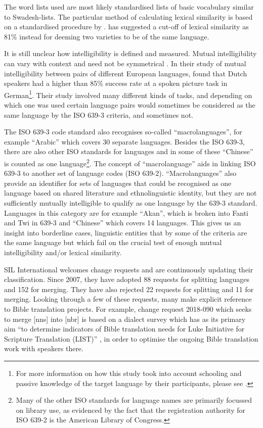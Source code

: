 \documentclass[unnumsec,webpdf,modern,medium]{oup-authoring-template}
\begin{document}
\begin{appendices}
The word lists used are most likely standardised lists of basic vocabulary similar to Swadesh-lists. The particular method of calculating lexical similarity is based on a standardised procedure by \citet{rensch1992calculating}. \citet[326]{swadesh1954perspectives} has suggested a cut-off of lexical similarity as 81\% instead for deeming two varieties to be of the same language. 

It is still unclear how intelligibility is defined and measured. Mutual intelligibility can vary with context and need not be symmetrical \citep[356]{NETTLE1998}. In their study of mutual intelligibility between pairs of different European languages, \citet{gooskens2017measuring} found that Dutch speakers had a higher than 85\% success rate at a spoken picture task in German\footnote{For more information on how this study took into account schooling and passive knowledge of the target language by their participants, please see \citet{gooskens2017measuring}.}. Their study involved many different kinds of tasks, and depending on which one was used certain language pairs would sometimes be considered as the same language by the ISO 639-3 criteria, and sometimes not.

The ISO 639-3 code standard also recognises so-called ``macrolanguages'', for example ``Arabic'' which covers 30 separate languages. Besides the ISO 639-3, there are also other ISO standards for languages and in some of these ``Chinese'' is counted as one language\footnote{Many of the other ISO standards for language names are primarily focussed on library use, as evidenced by the fact that the registration authority for ISO 639-2 is the American Library of Congress.}. The concept of ``macrolanguage'' aids in linking ISO 639-3 to another set of language codes (ISO 639-2). ``Macrolanguages'' also provide an identifier for sets of languages that could be recognised as one language based on shared literature and ethnolinguistic identity, but they are not sufficiently mutually intelligible to qualify as one language by the 639-3 standard. Languages in this category are for example ``Akan'', which is broken into Fanti and Twi in 639-3 and ``Chinese'' which covers 14 languages. This gives us an insight into borderline cases, linguistic entities that by some of the criteria are the same language but which fail on the crucial test of enough mutual intelligibility and/or lexical similarity. 

SIL International welcomes change requests and are continuously updating their classification. Since 2007, they have adopted 88 requests for splitting languages and 152 for merging. They have also rejected 22 requests for splitting and 11 for merging. Looking through a few of these requests, many make explicit reference to Bible translation projects. For example, change request 2018-090 which seeks to merge [nns] into [nbr] is based on a dialect survey which has as its primary aim ``to determine indicators of Bible translation needs for Luke Initiative for Scripture Translation (LIST)'' \citep{change_request_SIL_example}, in order to optimise the ongoing Bible translation work with speakers there.


\end{appendices}
\end{document}
